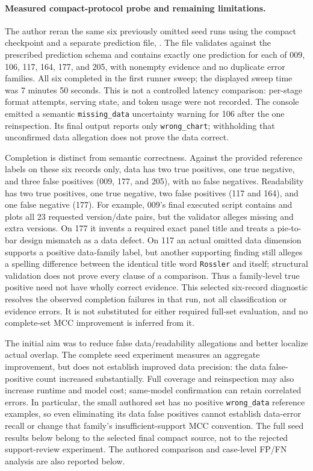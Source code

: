 \documentclass[11pt]{article}
\begin{document}
\paragraph{Measured compact-protocol probe and remaining limitations.}
The author reran the same six previously omitted seed runs using the
compact checkpoint and a separate prediction file,
.
The file validates against the prescribed prediction schema and contains
exactly one prediction for each of 009, 106, 117, 164, 177, and 205, with
nonempty evidence and no duplicate error families. All six completed in
the first runner sweep; the displayed sweep time was 7 minutes 50 seconds.
This is not a controlled latency comparison: per-stage format attempts,
serving state, and token usage were not recorded. The console emitted a
semantic \texttt{missing\_data} uncertainty warning for 106 after the one
reinspection. Its final output reports only \texttt{wrong\_chart}; withholding
that unconfirmed data allegation does not prove the data correct.

Completion is distinct from semantic correctness. Against the provided
reference labels on these six records only, data has two true positives,
one true negative, and three false positives (009, 177, and 205), with no
false negatives. Readability has two true positives, one true negative,
two false positives (117 and 164), and one false negative (177).
For example, 009's final executed script contains and plots all 23 requested
version/date pairs, but the validator alleges missing and extra versions.
On 177 it invents a required exact panel title and treats a pie-to-bar
design mismatch as a data defect. On 117 an actual omitted data dimension
supports a positive data-family label, but another supporting finding
still alleges a spelling difference between the identical title word
\texttt{Rossler} and itself; structural validation does not prove every
clause of a comparison. Thus a family-level true positive need not have
wholly correct evidence. This selected six-record diagnostic resolves the
observed completion failures in that run, not all classification or evidence
errors. It is not substituted for either required full-set evaluation,
and no complete-set MCC improvement is inferred from it.

The initial aim was to reduce false data/readability allegations and
better localize actual overlap. The complete seed experiment measures
an aggregate improvement, but does not establish improved data precision:
the data false-positive count increased substantially. Full coverage
and reinspection may also increase runtime and model cost; same-model
confirmation can retain correlated errors. In particular, the small
authored set has no positive \texttt{wrong\_data} reference examples,
so even eliminating its data false positives cannot establish data-error
recall or change that family's insufficient-support MCC convention.
The full seed results below belong to the selected final compact source,
not to the rejected support-review experiment. The authored comparison
and case-level FP/FN analysis are also reported below.
\end{document}
